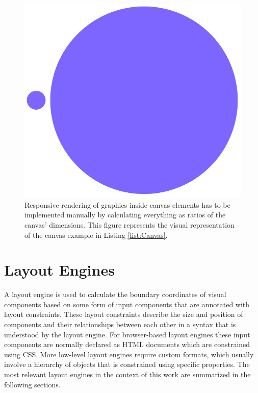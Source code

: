 \begin{figure}[tp]
    \centering
    \includegraphics[keepaspectratio,width=\linewidth,height=\fullh / 3]
    {images/canvas.png}

    \caption[Canvas With Responsive Circles]{
        Responsive rendering of graphics inside canvas elements has to be implemented manually by calculating everything as ratios of the canvas' dimensions. This figure represents the visual representation of the canvas example in Listing \ref{list:Canvas}.
          
    }
    \label{fig:Canvas}
\end{figure}


\section{Layout Engines}

A layout engine is used to calculate the boundary coordinates of visual components based on some form of input components that are annotated with layout constraints. These layout constraints describe the size and position of components and their relationships between each other in a syntax that is understood by the layout engine. For browser-based layout engines these input components are normally declared as HTML documents which are constrained using CSS. More low-level layout engines require custom formats, which usually involve a hierarchy of objects that is constrained using specific properties. The most relevant layout engines in the context of this work are summarized in the following sections.

